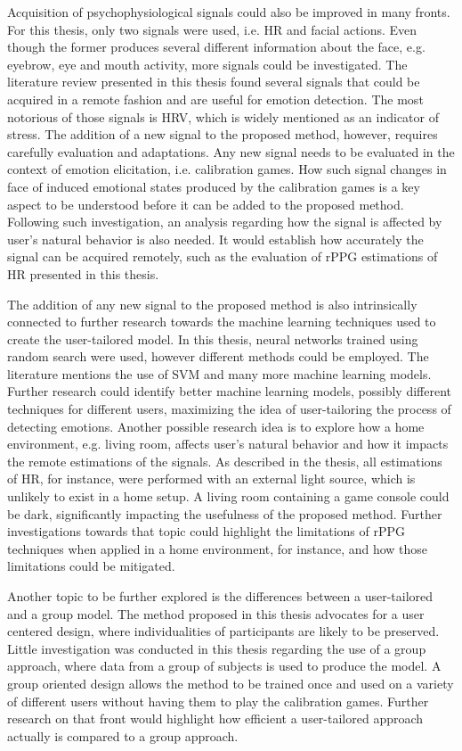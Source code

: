 Acquisition of psychophysiological signals could also be improved in many fronts. For this thesis, only two signals were used, i.e. HR and facial actions. Even though the former produces several different information about the face, e.g. eyebrow, eye and mouth activity, more signals could be investigated. The literature review presented in this thesis found several signals that could be acquired in a remote fashion and are useful for emotion detection. The most notorious of those signals is HRV, which is widely mentioned as an indicator of stress. The addition of a new signal to the proposed method, however, requires carefully evaluation  and adaptations. Any new signal needs to be evaluated in the context of emotion elicitation, i.e. calibration games. How such signal changes in face of induced emotional states produced by the calibration games is a key aspect to be understood before it can be added to the proposed method. Following such investigation, an analysis regarding how the signal is affected by user's natural behavior is also needed. It would establish how accurately the signal can be acquired remotely, such as the evaluation of rPPG estimations of HR presented in this thesis.

The addition of any new signal to the proposed method is also intrinsically connected to further research towards the machine learning techniques used to create the user-tailored model. In this thesis, neural networks trained using random search were used, however different methods could be employed. The literature mentions the use of SVM and many more machine learning models. Further research could identify better machine learning models, possibly different techniques for different users, maximizing the idea of user-tailoring the process of detecting emotions. Another possible research idea is to explore how a home environment, e.g. living room, affects user's natural behavior and how it impacts the remote estimations of the signals. As described in the thesis, all estimations of HR, for instance, were performed with an external light source, which is unlikely to exist in a home setup. A living room containing a game console could be dark, significantly impacting the usefulness of the proposed method. Further investigations towards that topic could highlight the limitations of rPPG techniques when applied in a home environment, for instance, and how those limitations could be mitigated.

Another topic to be further explored is the differences between a user-tailored and a group model. The method proposed in this thesis advocates for a user centered design, where individualities of participants are likely to be preserved. Little investigation was conducted in this thesis regarding the use of a group approach, where data from a group of subjects is used to produce the model. A group oriented design allows the method to be trained once and used on a variety of different users without having them to play the calibration games. Further research on that front would highlight how efficient a user-tailored approach actually is compared to a group approach.

